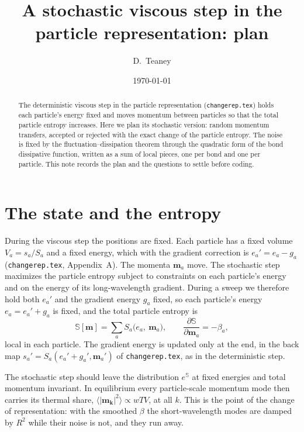 \documentclass[11pt,aps,preprint,nofootinbib,superscriptaddress,tightenlines]{revtex4-2}
\def\st{\begin{equation}}
\def\stp{\end{equation}}
\newcommand{\avg}[1]{\langle #1\rangle}
\begin{document}
\title{A stochastic viscous step in the particle representation: plan}
\author{D.~Teaney}
\date{\today}

\begin{abstract}
The deterministic viscous step in the particle representation
(\texttt{changerep.tex}) holds each particle's energy fixed and moves momentum
between particles so that the total particle entropy increases.  Here we plan
its stochastic version: random momentum transfers, accepted or rejected with
the exact change of the particle entropy.  The noise is fixed by the
fluctuation--dissipation theorem through the quadratic form of the bond
dissipative function, written as a sum of local pieces, one per bond and one
per particle.  This note records the plan and the questions to settle before
coding.
\end{abstract}

\maketitle

\section{The state and the entropy}
\label{sec:state}

During the viscous step the positions are fixed.  Each particle has a fixed
volume $V_a=s_a/S_a$ and a fixed energy, which with the gradient correction is
$e_a'=e_a-g_a$ (\texttt{changerep.tex}, Appendix~A).  The momenta $\bm m_a$ move.
The stochastic step maximizes the particle entropy subject to constraints on
each particle's energy and on the energy of its long-wavelength gradient.
During a sweep we therefore hold both $e_a'$ and the gradient energy $g_a$ fixed,
so each particle's energy $e_a=e_a'+g_a$ is fixed, and the total particle entropy
is
\st
\mathbb S[\bm m]=\sum_aS_a\big(e_a,\ \bm m_a\big),\qquad
\frac{\partial\mathbb S}{\partial\bm m_a}=-\beta_a ,
\label{Sbb}
\stp
local in each particle.  The gradient energy is updated only at the end, in the
back map $s_a'=S_a(e_a'+g_a',\bm m_a')$ of \texttt{changerep.tex}, as in the
deterministic step.

The stochastic step should leave the distribution $e^{\mathbb S}$ at fixed
energies and total momentum invariant.  In equilibrium every particle-scale
momentum mode then carries its thermal share, $\avg{|\bm m_{\bm k}|^2}\propto wTV$,
at all $k$.  This is the point of the change of representation: with the
smoothed $\beta$ the short-wavelength modes are damped by $R^2$ while their
noise is not, and they run away.
\end{document}
